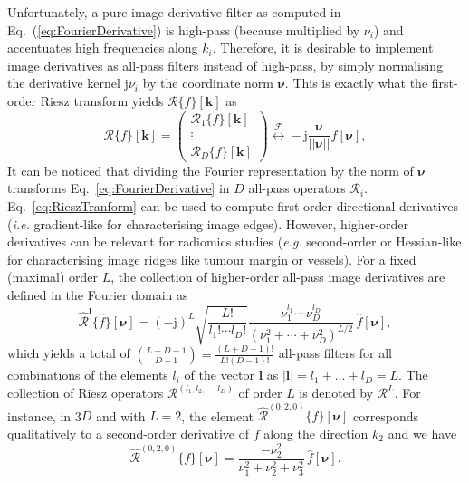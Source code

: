 \documentclass[fleqn,a4paper,oneside,openany]{book}
\begin{document}
Unfortunately, a pure image derivative filter as computed in Eq.~(\ref{eq:FourierDerivative}) is high-pass (because multiplied by $\nu_i$) and accentuates high frequencies along $k_i$.
Therefore, it is desirable to implement image derivatives as all-pass filters instead of high-pass, by simply normalising the derivative kernel $\mathrm{j}\nu_i$ by the coordinate norm $\boldsymbol{\nu}$.
This is exactly what the first-order Riesz transform yields $\boldsymbol{\mathcal{R}}\{f\}[\boldsymbol{k}]$ as~\cite{UnV2010}
%
\begin{equation}\label{eq:RieszTranform}
\boldsymbol{\mathcal{R}}\{f\}[\boldsymbol{k}]=
\left(
\begin{array}{c}
{\mathcal R}_1 \{f\}[\boldsymbol{k}]   \\
\vdots \\
{\mathcal R}_D \{f\}[\boldsymbol{k}] 
\end{array}
\right)
\overset{\mathcal{F}}{\longleftrightarrow} -\mathrm{j}\frac{\boldsymbol{\nu}}{||\boldsymbol{\nu}||}\hat{f}[\boldsymbol{\nu}],
\end{equation}
%
It can be noticed that dividing the Fourier representation by the norm of $\boldsymbol{\nu}$ transforms Eq.~\eqref{eq:FourierDerivative} in $D$ all-pass operators $\mathcal{R}_i$.
Eq.~\eqref{eq:RieszTranform} can be used to compute first-order directional derivatives (\textit{i.e.} gradient-like for characterising image edges).
However, higher-order derivatives can be relevant for radiomics studies (\textit{e.g.} second-order or Hessian-like for characterising image ridges like tumour margin or vessels).
For a fixed (maximal) order $L$, the collection of higher-order all-pass image derivatives are defined in the Fourier domain as
%
\begin{equation}\label{eq:RieszTransformHigherOrder}
\widehat{\boldsymbol{\mathcal{R}}}^{\boldsymbol{l}}\{\hat{f}\}[\boldsymbol{\nu}]=
(-\mathrm{j})^L
\sqrt{\frac{L!}{l_1!\cdots l_D!}}
\frac{\nu_1^{l_1}\cdots\,\nu_D^{l_D}}
{\left( \nu_1^2+\cdots+\nu_D^2 \right)^{L/2}}
\,\hat{f}[\boldsymbol{\nu}],
\end{equation}
%
which yields a total of ${{L+D-1}\choose{D-1}}=\frac{(L+D-1)!}{L!(D-1)!}$ all-pass filters for all combinations of the elements $l_i$ of the vector $\boldsymbol{l}$ as $|\boldsymbol{l}|=l_1+\dots+l_D=L$.
The collection of Riesz operators $\boldsymbol{\mathcal{R}}^{(l_1,l_2,\dots,l_D)}$ of order $L$ is denoted by $\boldsymbol{\mathcal{R}}^L$.
For instance, in 3$D$ and with $L=2$, the element $\widehat{\mathcal{R}}^{(0,2,0)}\{f\}[\boldsymbol{\nu}]$ corresponds qualitatively to a second-order derivative of $f$ along the direction $k_2$ and we have $$\widehat{\mathcal{R}}^{(0,2,0)}\{f\}[\boldsymbol{\nu}]=
\frac{-\nu_2^{2}}
{\nu_1^2+\nu_2^2+\nu_3^2}
\,\hat{f}[\boldsymbol{\nu}].$$
\end{document}
